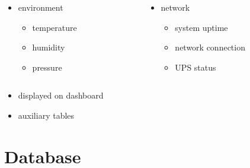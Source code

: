 \documentclass[12pt, aspectratio=1610]{beamer}
\begin{document}
{{                \begin{columns}
                    \begin{column}{0.5\textwidth}
                        \begin{itemize}
                            \item environment
                                \begin{itemize}
                                    \item temperature
                                    \item humidity
                                    \item pressure
                                \end{itemize}
                        \end{itemize}
                    \end{column}
                    \pause
                    \begin{column}{0.5\textwidth}
                        \begin{itemize}
                            \item network
                                \begin{itemize}
                                    \item system uptime
                                    \item network connection
                                    \item UPS status
                                \end{itemize}
                        \end{itemize}
                    \end{column}
                \end{columns}

                \begin{itemize}
                    \item displayed on dashboard
                    \item auxiliary tables
                \end{itemize}
            }
        }
        
    \section{Database}
\end{document}
